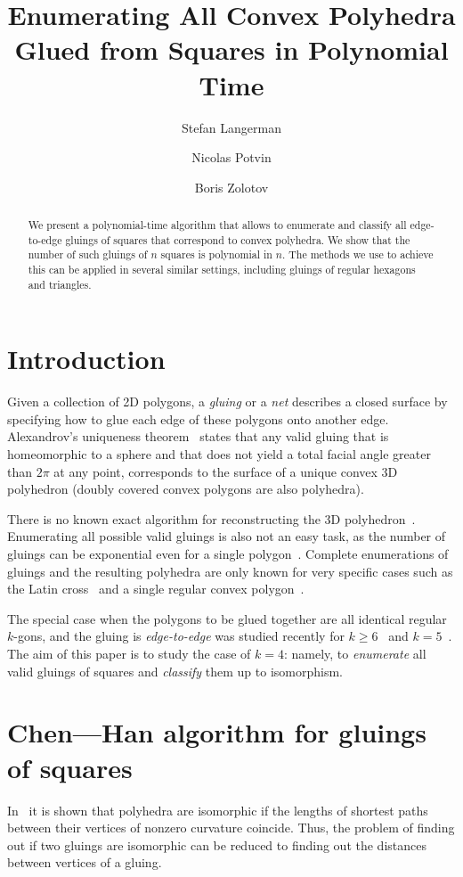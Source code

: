 \documentclass[a4paper,USenglish,cleveref, autoref, thm-restate]{socg-lipics-v2019}
\title{Enumerating All Convex Polyhedra Glued from Squares in Polynomial Time}
\author{Stefan Langerman}{Faculté des Sciences, Université Libre de Bruxelles}{stefan.langerman@ulb.ac.be}{ }{Whatever grant}
\author{Nicolas Potvin}{Faculté des Sciences, Université Libre de Bruxelles}{potvinnicolas2@gmail.com}{ }{Whatever grant}
\author{Boris Zolotov}{Department of Mathematics and Computer Sciences, St. Petersburg State University}{boris.a.zolotov@yandex.com}{ }{Whatever grant}
\begin{document}
\maketitle

\begin{abstract}We present a polynomial-time algorithm that allows to enumerate and classify all edge-to-edge gluings of squares that correspond to convex polyhedra. We show that the number of such gluings of $n$ squares is polynomial in $n$. The methods we use to achieve this can be applied in several similar settings, including gluings of regular hexagons and triangles.\end{abstract}

\section{Introduction}

Given a collection of 2D polygons, a \emph{gluing} or a \emph{net} describes a closed surface by specifying how to glue each edge of these polygons onto another edge. Alexandrov's uniqueness theorem~\cite{alex} states that any valid gluing that is homeomorphic to a sphere and that does not yield a total facial angle greater than $2\pi$ at any point, corresponds to the surface of a unique convex 3D polyhedron (doubly covered convex polygons are also polyhedra).

There is no known exact algorithm for reconstructing the 3D polyhedron~\cite{bannister2014galois,kpd09-approx}. Enumerating all possible valid gluings is also not an easy task, as the number of gluings can be exponential even for a single polygon~\cite{DDLO02}. Complete enumerations of gluings and the resulting polyhedra are only known for very specific cases such as the Latin cross~\cite{ddlop99} and a single regular convex polygon~\cite{DO07}.

The special case when the polygons to be glued together are all identical regular $k$-gons, and the gluing is \emph{edge-to-edge} was studied recently for $k \ge 6$~\cite{kl17-hex} and $k=5$~\cite{alz-penta}. The aim of this paper is to study the case of $k=4$: namely, to {\it enumerate} all valid gluings of squares and {\it classify} them up to isomorphism.

\section{Chen—Han algorithm for gluings of squares}

In~\cite{DO07} it is shown that polyhedra are isomorphic if the lengths of shortest paths between their vertices of nonzero curvature coincide. Thus, the problem of finding out if two gluings are isomorphic can be reduced to finding out the distances between vertices of a gluing.
\end{document}
